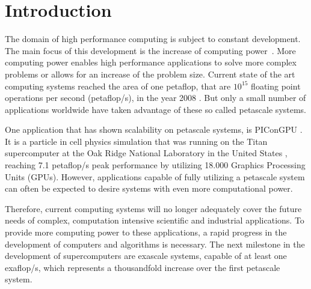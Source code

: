 \chapter{Introduction}
\label{sec:intro}



The domain of high performance computing is subject to constant
development.  The main focus of this development is the increase of
computing power~\cite{ref:performance_development}.  More computing power enables high performance
applications to solve more complex problems or allows for an increase of the problem
size.  Current state of the art computing systems reached the area of
one petaflop, that are $10^{15}$ floating point operations per second
(petaflop/s), in the year 2008 \cite{ref:ibm_roadrunner}. But only a
small number of applications worldwide have taken advantage of these
so called petascale systems.

One application that has shown scalability on petascale systems, is
PIConGPU \cite{ref:picongpu_scale}. It is a particle in cell physics
simulation that was running on the Titan supercomputer at the Oak
Ridge National Laboratory in the United States \cite{ref:titan},
reaching 7.1 petaflop/s peak performance by utilizing 18.000 Graphics
Processing Units (GPUs). However, applications capable of fully
utilizing a petascale system can often be expected to desire systems
with even more computational power.

Therefore, current computing systems will no longer adequately cover
the future needs of complex, computation intensive scientific and
industrial applications.  To provide more computing power to these
applications, a rapid progress in the development of computers and
algorithms is necessary. The next milestone in the development of
supercomputers are exascale systems, capable of at least one
exaflop/s, which represents a thousandfold increase over the first
petascale system.

